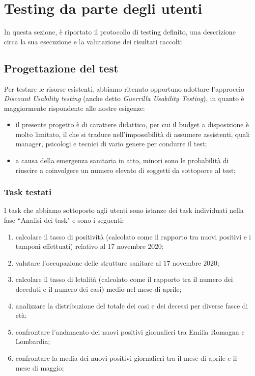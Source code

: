 \section{Testing da parte degli utenti}
\label{s:verifica-risorse-esistenti-testing-utenti}
In questa sezione, è riportato il protocollo di testing definito, una descrizione circa la sua esecuzione e la valutazione dei risultati raccolti
\subsection{Progettazione del test}
\label{ss:vre-progettazione-test}
Per testare le risorse esistenti, abbiamo ritenuto opportuno adottare l'approccio \textit{Discount Usability testing} (anche detto \textit{Guerrilla Usability Testing}), in quanto è maggiormente rispondente alle nostre esigenze: 
\begin{itemize}
    \item il presente progetto è di carattere didattico, per cui il budget a disposizione è molto limitato, il che si traduce nell'impossibilità di assumere assistenti, quali manager, psicologi e tecnici di vario genere per condurre il test;
    \item a causa della emergenza sanitaria in atto, minori sono le probabilità di riuscire a coinvolgere un numero elevato di soggetti da sottoporre al test;
\end{itemize}

\subsubsection{Task testati}
\label{sss:task-testati}
I task che abbiamo sottoposto agli utenti sono istanze dei task individuati nella fase ``Analisi dei task" e sono i seguenti:
\begin{enumerate}
    \item calcolare il tasso di positività (calcolato come il rapporto tra nuovi positivi e i tamponi effettuati) relativo al 17 novembre 2020;    
    \item valutare l'occupazione delle strutture sanitare al 17 novembre 2020;
    \item calcolare il tasso di letalità (calcolato come il rapporto tra il numero dei deceduti e il numero dei casi) medio nel mese di aprile;
    \item analizzare la distribuzione del totale dei casi e dei decessi per diverse fasce di età;
    \item confrontare l'andamento dei nuovi positivi giornalieri tra Emilia Romagna e Lombardia;
    \item confrontare la media dei nuovi positivi giornalieri tra il mese di aprile e il mese di maggio;
\end{enumerate}

